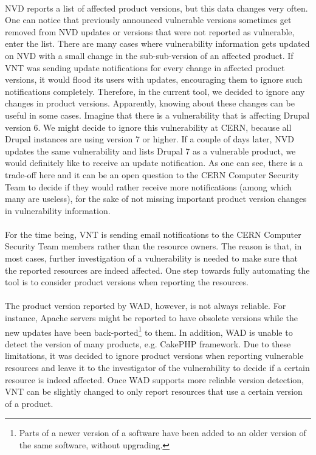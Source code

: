 \paragraph{}
NVD reports a list of affected product versions, but this data changes very often. One can notice that previously announced vulnerable versions sometimes get removed from NVD updates or versions that were not reported as vulnerable, enter the list. There are many cases where vulnerability information gets updated on NVD with a small change in the sub-sub-version of an affected product. If VNT was sending update notifications for every change in affected product versions, it would flood its users with updates, encouraging them to ignore such notifications completely. Therefore, in the current tool, we decided to ignore any changes in product versions. Apparently, knowing about these changes can be useful in some cases. Imagine that there is a vulnerability that is affecting Drupal version 6. We might decide to ignore this vulnerability at CERN, because all Drupal instances are using version 7 or higher. If a couple of days later, NVD updates the same vulnerability and lists Drupal 7 as a vulnerable product, we would definitely like to receive an update notification. As one can see, there is a trade-off here and it can be an open question to the CERN Computer Security Team to decide if they would rather receive more notifications (among which many are useless), for the sake of not missing important product version changes in vulnerability information.
\paragraph{}
For the time being, VNT is sending email notifications to the CERN Computer Security Team members rather than the resource owners. The reason is that, in most cases, further investigation of a vulnerability is needed to make sure that the reported resources are indeed affected. One step towards fully automating the tool is to consider product versions when reporting the resources.
\paragraph{}
The product version reported by WAD, however, is not always reliable. For instance, Apache servers might be reported to have obsolete versions while the new updates have been back-ported\footnote{Parts of a newer version of a software have been added to an older version of the same software, without upgrading.} to them. In addition, WAD is unable to detect the version of many products, e.g. CakePHP framework. Due to these limitations, it was decided to ignore product versions when reporting vulnerable resources and leave it to the investigator of the vulnerability to decide if a certain resource is indeed affected. Once WAD supports more reliable version detection, VNT can be slightly changed to only report resources that use a certain version of a product.
